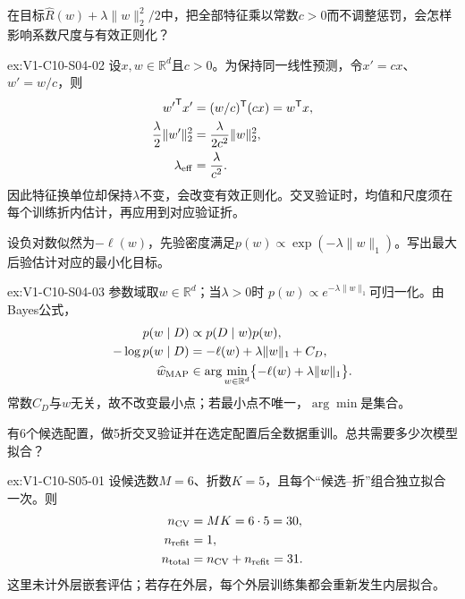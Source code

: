 \begin{SLChapterExercisePairSection}
\begin{exercise}\label{ex:V1-C10-S04-02}
在目标$\widehat R(w)+\lambda\|w\|_2^2/2$中，把全部特征乘以常数$c>0$而不调整惩罚，会怎样影响系数尺度与有效正则化？
\end{exercise}
\label{sol:V1-C10-S04-02}
\begin{chapterexercisesolution}{ex:V1-C10-S04-02}
设$x,w\in\mathbb R^d$且$c>0$。为保持同一线性预测，令$x'=cx$、$w'=w/c$，则
\[
\begin{aligned}
{w'}^{\mathsf T}x'&=(w/c)^{\mathsf T}(cx)=w^{\mathsf T}x,\\
\frac{\lambda}{2}\lVert w'\rVert_2^2
  &=\frac{\lambda}{2c^2}\lVert w\rVert_2^2,\\
\lambda_{\rm eff}&=\frac{\lambda}{c^2}.
\end{aligned}
\]
因此特征换单位却保持$\lambda$不变，会改变有效正则化。交叉验证时，均值和尺度须在每个训练折内估计，再应用到对应验证折。
\end{chapterexercisesolution}

\begin{exercise}\label{ex:V1-C10-S04-03}
设负对数似然为$-\ell(w)$，先验密度满足$p(w)\propto\exp(-\lambda\|w\|_1)$。写出最大后验估计对应的最小化目标。
\end{exercise}
\label{sol:V1-C10-S04-03}
\begin{chapterexercisesolution}{ex:V1-C10-S04-03}
参数域取$w\in\mathbb R^d$；当$\lambda>0$时
$p(w)\propto e^{-\lambda\lVert w\rVert_1}$可归一化。由Bayes公式，
\[
\begin{aligned}
p(w\mid D)&\propto p(D\mid w)p(w),\\
-\log p(w\mid D)
  &=-\ell(w)+\lambda\lVert w\rVert_1+C_D,\\
\widehat w_{\rm MAP}
  &\in\arg\min_{w\in\mathbb R^d}
    \bigl\{-\ell(w)+\lambda\lVert w\rVert_1\bigr\}.
\end{aligned}
\]
常数$C_D$与$w$无关，故不改变最小点；若最小点不唯一，$\arg\min$是集合。
\end{chapterexercisesolution}

\begin{exercise}\label{ex:V1-C10-S05-01}
有6个候选配置，做5折交叉验证并在选定配置后全数据重训。总共需要多少次模型拟合？
\end{exercise}
\label{sol:V1-C10-S05-01}
\begin{chapterexercisesolution}{ex:V1-C10-S05-01}
设候选数$M=6$、折数$K=5$，且每个“候选--折”组合独立拟合一次。则
\[
\begin{aligned}
n_{\rm CV}&=MK=6\cdot5=30,\\
n_{\rm refit}&=1,\\
n_{\rm total}&=n_{\rm CV}+n_{\rm refit}=31.
\end{aligned}
\]
这里未计外层嵌套评估；若存在外层，每个外层训练集都会重新发生内层拟合。
\end{chapterexercisesolution}


\end{SLChapterExercisePairSection}

